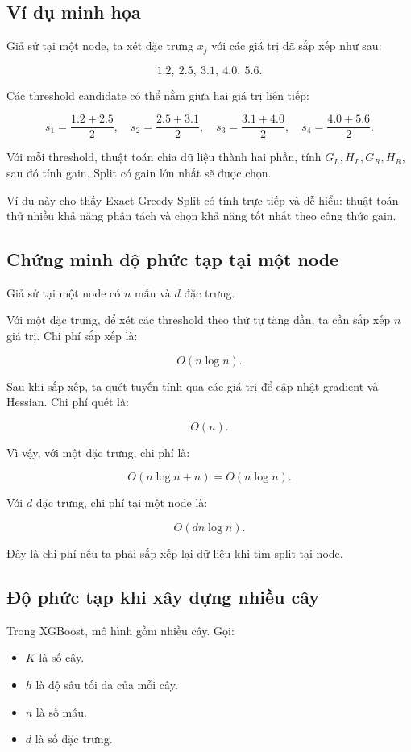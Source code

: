 \subsection{Ví dụ minh họa}

Giả sử tại một node, ta xét đặc trưng $x_j$ với các giá trị đã sắp xếp như sau:

\[
1.2,\ 2.5,\ 3.1,\ 4.0,\ 5.6.
\]

Các threshold candidate có thể nằm giữa hai giá trị liên tiếp:

\[
s_1 = \frac{1.2 + 2.5}{2},
\quad
s_2 = \frac{2.5 + 3.1}{2},
\quad
s_3 = \frac{3.1 + 4.0}{2},
\quad
s_4 = \frac{4.0 + 5.6}{2}.
\]

Với mỗi threshold, thuật toán chia dữ liệu thành hai phần, tính $G_L, H_L, G_R, H_R$, sau đó tính gain. Split có gain lớn nhất sẽ được chọn.

Ví dụ này cho thấy Exact Greedy Split có tính trực tiếp và dễ hiểu: thuật toán thử nhiều khả năng phân tách và chọn khả năng tốt nhất theo công thức gain.

\subsection{Chứng minh độ phức tạp tại một node}

Giả sử tại một node có $n$ mẫu và $d$ đặc trưng.

Với một đặc trưng, để xét các threshold theo thứ tự tăng dần, ta cần sắp xếp $n$ giá trị. Chi phí sắp xếp là:

\[
O(n \log n).
\]

Sau khi sắp xếp, ta quét tuyến tính qua các giá trị để cập nhật gradient và Hessian. Chi phí quét là:

\[
O(n).
\]

Vì vậy, với một đặc trưng, chi phí là:

\[
O(n \log n + n) = O(n \log n).
\]

Với $d$ đặc trưng, chi phí tại một node là:

\[
O(dn \log n).
\]

Đây là chi phí nếu ta phải sắp xếp lại dữ liệu khi tìm split tại node.

\subsection{Độ phức tạp khi xây dựng nhiều cây}

Trong XGBoost, mô hình gồm nhiều cây. Gọi:

\begin{itemize}
    \item $K$ là số cây.
    \item $h$ là độ sâu tối đa của mỗi cây.
    \item $n$ là số mẫu.
    \item $d$ là số đặc trưng.
\end{itemize}

